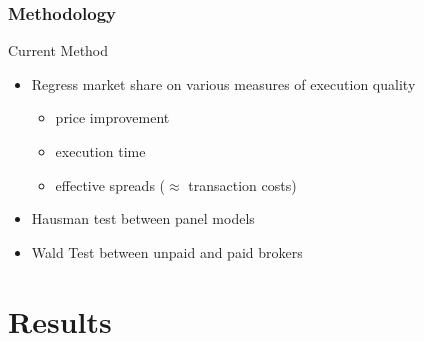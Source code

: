 \documentclass[11pt]{beamer}
\begin{document}
\begin{frame}
\frametitle{Methodology}



\begin{block}	
	{Current Method}
	\begin{itemize}
		\item Regress market share on various measures of execution quality 
		\begin{itemize}
			\item price improvement
			\item execution time
			\item effective spreads ($\approx$ transaction costs)
		\end{itemize}
		\item Hausman test between panel models
		\item Wald Test between unpaid and paid brokers
	\end{itemize}
\end{block}

\end{frame}




\section{Results}
\end{document}
